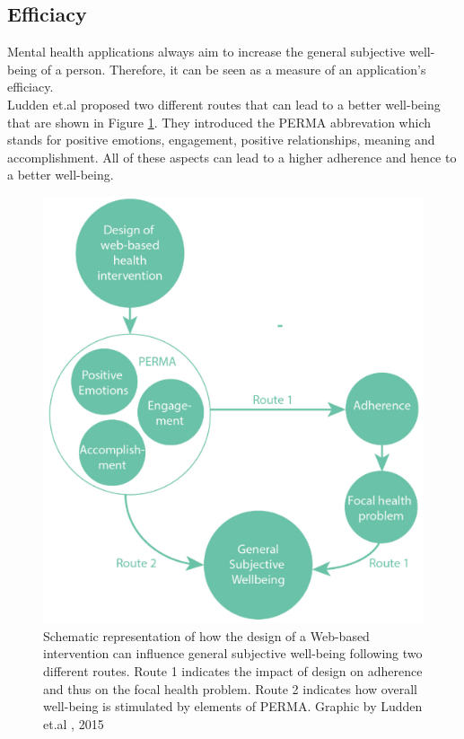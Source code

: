 \documentclass[sigconf, nonacm]{acmart}
\begin{document}
\subsection{Efficiacy}
Mental health applications always aim to increase the general subjective well-being of a person. Therefore, it can be seen as a measure of an application's efficiacy.
\\    
Ludden et.al \cite{Ludden2015} proposed two different routes that can lead to a better well-being that are shown in Figure \ref{fig:routes}. They introduced the PERMA abbrevation which stands for positive emotions, engagement, positive relationships, meaning and accomplishment. All of these aspects can lead to a higher adherence and hence to a better well-being.
\\
\begin{figure}[h]
  \centering
  \includegraphics[width=\linewidth]{routes}
  \caption{Schematic representation of how the design of a Web-based intervention can influence general subjective well-being following two different routes. Route 1 indicates the impact of design on adherence and thus on the focal health problem. Route 2 indicates how overall well-being is stimulated by elements of PERMA. Graphic by Ludden et.al \cite{Ludden2015}, 2015}
  \label{fig:routes}
\end{figure}
\end{document}
